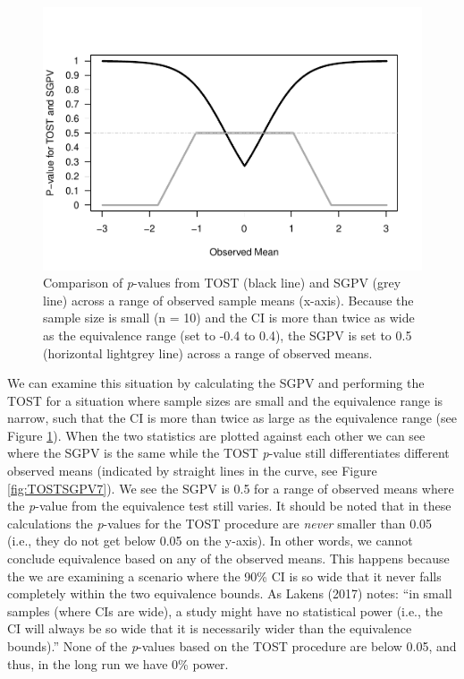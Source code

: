 \documentclass[,man,floatsintext]{apa6}
\begin{document}
\begin{figure}
\centering
\includegraphics{manuscript.R1_files/figure-latex/TOSTSGPV6-1.pdf}
\caption{\label{fig:TOSTSGPV6}Comparison of \emph{p}-values from TOST (black
line) and SGPV (grey line) across a range of observed sample means
(x-axis). Because the sample size is small (n = 10) and the CI is more
than twice as wide as the equivalence range (set to -0.4 to 0.4), the
SGPV is set to 0.5 (horizontal lightgrey line) across a range of
observed means.}
\end{figure}

We can examine this situation by calculating the SGPV and performing the
TOST for a situation where sample sizes are small and the equivalence
range is narrow, such that the CI is more than twice as large as the
equivalence range (see Figure \ref{fig:TOSTSGPV6}). When the two
statistics are plotted against each other we can see where the SGPV is
the same while the TOST \emph{p}-value still differentiates different
observed means (indicated by straight lines in the curve, see Figure
\ref{fig:TOSTSGPV7}). We see the SGPV is 0.5 for a range of observed
means where the \emph{p}-value from the equivalence test still varies.
It should be noted that in these calculations the \emph{p}-values for
the TOST procedure are \emph{never} smaller than 0.05 (i.e., they do not
get below 0.05 on the y-axis). In other words, we cannot conclude
equivalence based on any of the observed means. This happens because the
we are examining a scenario where the 90\% CI is so wide that it never
falls completely within the two equivalence bounds. As Lakens (2017)
notes: \enquote{in small samples (where CIs are wide), a study might
have no statistical power (i.e., the CI will always be so wide that it
is necessarily wider than the equivalence bounds).} None of the
\emph{p}-values based on the TOST procedure are below 0.05, and thus, in
the long run we have 0\% power.
\end{document}
